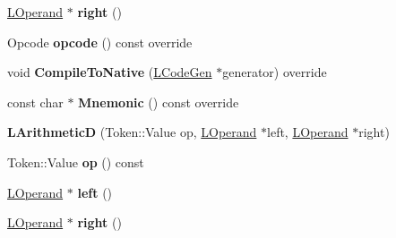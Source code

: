 \begin{DoxyCompactItemize}
\item 
\hyperlink{classv8_1_1internal_1_1_l_operand}{L\+Operand} $\ast$ {\bfseries right} ()\hypertarget{classv8_1_1internal_1_1_l_arithmetic_d_ad78701fa7af5138fc5a741a1ceed96a7}{}\label{classv8_1_1internal_1_1_l_arithmetic_d_ad78701fa7af5138fc5a741a1ceed96a7}

\item 
Opcode {\bfseries opcode} () const  override\hypertarget{classv8_1_1internal_1_1_l_arithmetic_d_a6371d86c37944a1a90b2e4778d0b7024}{}\label{classv8_1_1internal_1_1_l_arithmetic_d_a6371d86c37944a1a90b2e4778d0b7024}

\item 
void {\bfseries Compile\+To\+Native} (\hyperlink{classv8_1_1internal_1_1_l_code_gen}{L\+Code\+Gen} $\ast$generator) override\hypertarget{classv8_1_1internal_1_1_l_arithmetic_d_a87834ef9f5e37f8ade4c8e8ef4284572}{}\label{classv8_1_1internal_1_1_l_arithmetic_d_a87834ef9f5e37f8ade4c8e8ef4284572}

\item 
const char $\ast$ {\bfseries Mnemonic} () const  override\hypertarget{classv8_1_1internal_1_1_l_arithmetic_d_a401c29ddc6c8aa2dc41d23d4be14aff7}{}\label{classv8_1_1internal_1_1_l_arithmetic_d_a401c29ddc6c8aa2dc41d23d4be14aff7}

\item 
{\bfseries L\+ArithmeticD} (Token\+::\+Value op, \hyperlink{classv8_1_1internal_1_1_l_operand}{L\+Operand} $\ast$left, \hyperlink{classv8_1_1internal_1_1_l_operand}{L\+Operand} $\ast$right)\hypertarget{classv8_1_1internal_1_1_l_arithmetic_d_aad5c45947dcad72abbbcd55b081f4e6e}{}\label{classv8_1_1internal_1_1_l_arithmetic_d_aad5c45947dcad72abbbcd55b081f4e6e}

\item 
Token\+::\+Value {\bfseries op} () const \hypertarget{classv8_1_1internal_1_1_l_arithmetic_d_a0689ba0a4deee0bb4450bb0fdc7f877b}{}\label{classv8_1_1internal_1_1_l_arithmetic_d_a0689ba0a4deee0bb4450bb0fdc7f877b}

\item 
\hyperlink{classv8_1_1internal_1_1_l_operand}{L\+Operand} $\ast$ {\bfseries left} ()\hypertarget{classv8_1_1internal_1_1_l_arithmetic_d_a8d143eb5deb9725b2544b7ecc1a6b7aa}{}\label{classv8_1_1internal_1_1_l_arithmetic_d_a8d143eb5deb9725b2544b7ecc1a6b7aa}

\item 
\hyperlink{classv8_1_1internal_1_1_l_operand}{L\+Operand} $\ast$ {\bfseries right} ()\hypertarget{classv8_1_1internal_1_1_l_arithmetic_d_ad78701fa7af5138fc5a741a1ceed96a7}{}\label{classv8_1_1internal_1_1_l_arithmetic_d_ad78701fa7af5138fc5a741a1ceed96a7}


\end{DoxyCompactItemize}
